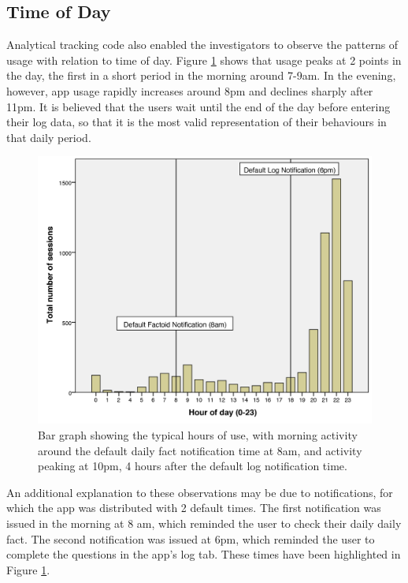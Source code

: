 \subsection{Time of Day} \label{subsection: time-of-day}
Analytical tracking code also enabled the investigators to observe the patterns of usage with relation to time of day. Figure \ref{fig: time-of-day} shows that usage peaks at 2 points in the day, the first in a short period in the morning around 7-9am. In the evening, however, app usage rapidly increases around 8pm and declines sharply after 11pm. It is believed that the users wait until the end of the day before entering their log data, so that it is the most valid representation of their behaviours in that daily period.

 \begin{figure}[h]
    \centering
    \includegraphics[scale=0.18, angle=0]{Files/prevention-study-3/figures/hour-of-day}
    \caption{Bar graph showing the typical hours of use, with morning activity around the default daily fact notification time at 8am, and activity peaking at 10pm, 4 hours after the default log notification time.}
    \label{fig: time-of-day}
\end{figure}

An additional explanation to these observations may be due to notifications, for which the app was distributed with 2 default times. The first notification was issued in the morning at 8 am, which reminded the user to check their daily daily fact. The second notification was issued at 6pm, which reminded the user to complete the questions in the app’s log tab. These times have been highlighted in Figure \ref{fig: time-of-day}.


